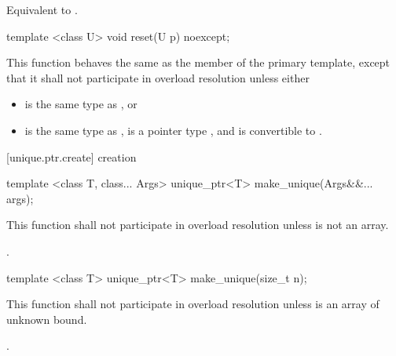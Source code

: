 \begin{itemdescr}
\pnum
\effects Equivalent to .
\end{itemdescr}

\begin{itemdecl}
template <class U> void reset(U p) noexcept;
\end{itemdecl}

\begin{itemdescr}
\pnum
This function behaves the same as
the  member of the primary template,
except that it shall not participate in overload resolution
unless either

\begin{itemize}
\item {} is the same type as , or
\item {} is the same type as ,
       is a pointer type , and
       is convertible to .
\end{itemize}
\end{itemdescr}

[unique.ptr.create]{ creation}

\begin{itemdecl}
template <class T, class... Args> unique_ptr<T> make_unique(Args&&... args);
\end{itemdecl}

\begin{itemdescr}
\pnum
\remarks This function shall not participate in overload resolution unless  is not an array.

\pnum
\returns {}.

\end{itemdescr}

\begin{itemdecl}
template <class T> unique_ptr<T> make_unique(size_t n);
\end{itemdecl}

\begin{itemdescr}
\pnum
\remarks This function shall not participate in overload resolution unless  is an array of unknown bound.

\pnum
\returns {}.

\end{itemdescr}

